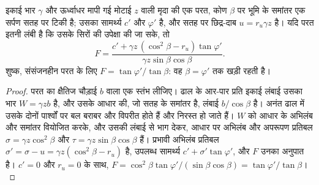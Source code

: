 \begin{proposition}[अनंत ढाल]\label{prop:b2:geological-hazards:infinite-slope}
इकाई भार $\gamma$ और ऊर्ध्वाधर मापी गई मोटाई $z$ वाली मृदा की एक परत, कोण $\beta$ पर भूमि के समांतर
एक सर्पण सतह पर टिकी है; उसका सामर्थ्य $c'$ और $\varphi'$ है, और सतह पर
छिद्र-दाब $u = r_u \gamma z$ है। यदि परत इतनी लंबी है कि उसके सिरों की
उपेक्षा की जा सके, तो
\begin{equation}
F = \frac{c' + \gamma z\,(\cos^2\beta - r_u)\tan\varphi'}{\gamma z \sin\beta\cos\beta}.
\label{eq:b2:geological-hazards:infinite-slope}
\end{equation}
शुष्क, संसंजनहीन परत के लिए $F = \tan\varphi'/\tan\beta$: वह $\beta = \varphi'$ तक खड़ी रहती है।
\end{proposition}

\begin{proof}
परत का क्षैतिज चौड़ाई $b$ वाला एक स्तंभ लीजिए। ढाल के आर-पार प्रति इकाई लंबाई उसका भार $W = \gamma z b$ है,
और उसके आधार की, जो सतह के समांतर है, लंबाई $b/\cos\beta$ है। अनंत ढाल में उसके
दोनों पार्श्वों पर बल बराबर और विपरीत होते हैं और निरस्त हो जाते हैं। $W$ को आधार के अभिलंब
और समांतर वियोजित करके, और उसकी लंबाई से भाग देकर, आधार पर अभिलंब और अपरूपण प्रतिबल
$\sigma = \gamma z\cos^2\beta$ और $\tau = \gamma z \sin\beta\cos\beta$ हैं। प्रभावी अभिलंब
प्रतिबल $\sigma' = \sigma - u = \gamma z(\cos^2\beta - r_u)$ है, उपलब्ध सामर्थ्य $c' +
\sigma'\tan\varphi'$, और $F$ उनका अनुपात है। $c' = 0$ और $r_u = 0$ के साथ, $F = \cos^2\beta
\tan\varphi'/(\sin\beta\cos\beta) = \tan\varphi'/\tan\beta$।
\end{proof}

